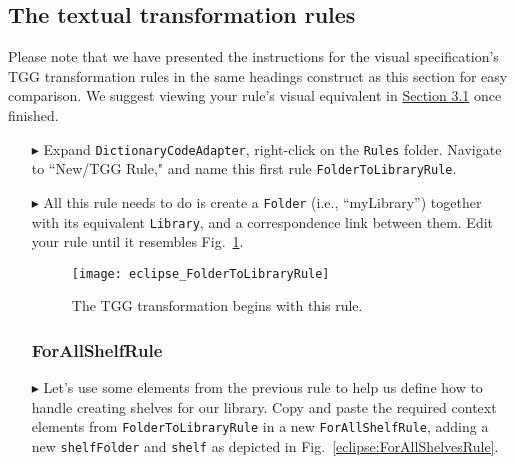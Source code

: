 \newpage
\hypertarget{treeToModel tex}{}
\subsection{The textual transformation rules}
\texHeader

Please note that we have presented the instructions for the visual specification's TGG transformation rules in the same headings construct as this section for
easy comparison. We suggest viewing your rule's visual equivalent in \hyperlink{treeToModel tex}{Section 3.1} once finished.

\begin{itemize}

\subsubsection{FolderToLibraryRule} %

\item[$\blacktriangleright$] Expand \texttt{DictionaryCodeAdapter}, right-click on the \texttt{Rules} folder. Navigate to ``New/TGG Rule," and name this
first rule \texttt{Folder\-To\-Lib\-rary\-Rule}.

\item[$\blacktriangleright$] All this rule needs to do is create a \texttt{Folder} (i.e., ``myLibrary'') together with its equivalent \texttt{Library}, and a
correspondence link between them. Edit your rule until it resembles Fig.~\ref{eclipse:FolderToLibraryRule}.

\vspace{0.5cm}

\begin{figure}[htbp]
\begin{center}
  \texttt{[image: eclipse\_FolderToLibraryRule]}
  \caption{The TGG transformation begins with this rule.}
  \label{eclipse:FolderToLibraryRule}
\end{center}
\end{figure}

\vspace{-0.5cm}

\subsubsection{ForAllShelfRule} %

\item[$\blacktriangleright$] Let's use some elements from the previous rule to help us define how to handle creating shelves for our library. Copy and paste the
required context elements from \texttt{FolderToLibraryRule} in a new \texttt{ForAllShelfRule}, adding a new \texttt{shelfFolder} and \texttt{shelf} as depicted
in Fig.~\ref{eclipse:ForAllShelvesRule}.


\end{itemize}
